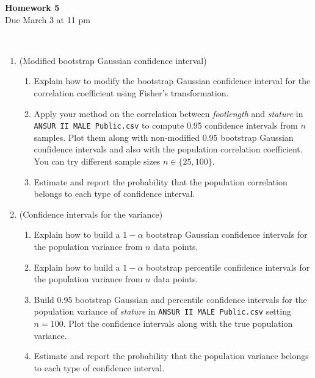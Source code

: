 \documentclass[12pt,twoside]{article}
\begin{document}
\begin{center}
{\large{\textbf{Homework 5}} } \vspace{0.2cm}\\
Due  March 3 at 11 pm
\\
\end{center}
\\

\begin{enumerate}


\item (Modified bootstrap Gaussian confidence interval)
\begin{enumerate}
\item Explain how to modify the bootstrap Gaussian confidence interval for the correlation coefficient using Fisher's transformation. 
\item 
Apply your method on the correlation between \textit{footlength} and \textit{stature} in \texttt{ANSUR\ II\ MALE\ Public.csv} to compute 0.95 confidence intervals from $n$ samples. Plot them along with non-modified 0.95 bootstrap Gaussian confidence intervals and also with the population correlation coefficient.  You can try different sample sizes $n \in \{25, 100 \}$.
\item Estimate and report the probability that the population correlation belongs to each type of confidence interval. 
\end{enumerate}

\item (Confidence intervals for the variance) 
\begin{enumerate}
\item Explain how to build a $1-\alpha$ bootstrap Gaussian confidence intervals for the population variance from $n$ data points.
\item Explain how to build a $1-\alpha$ bootstrap percentile confidence intervals for the population variance from $n$ data points.
\item Build 0.95 bootstrap Gaussian and percentile confidence intervals for the population variance of \textit{stature} in \texttt{ANSUR\ II\ MALE\ Public.csv} setting $n=100$. Plot the confidence intervals along with the true population variance. 
\item Estimate and report the probability that the population variance belongs to each type of confidence interval.

\end{enumerate}

\end{enumerate}
\end{document}
